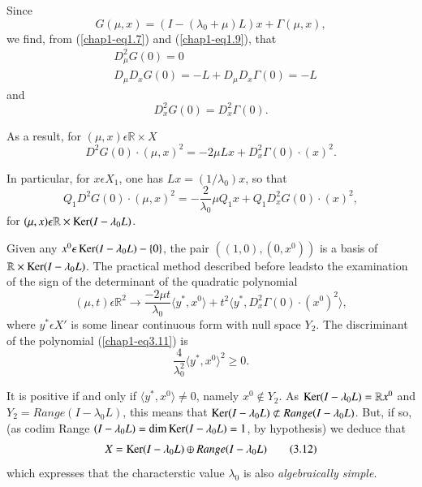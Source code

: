 Since
$$
G(\mu, x) = (I - (\lambda_{0} + \mu) L) x + \Gamma(\mu, x),
$$
we find, from (\ref{chap1-eq1.7}) and (\ref{chap1-eq1.9}), that
\begin{align*}
& D_{\mu}^{2}G(0) = 0\\
& D_{\mu}D_{x}G(0) = -L + D_{\mu} D_{x} \Gamma (0) = -L
\end{align*}
and
$$
D_{x}^{2}G(0) = D_{x}^{2}\Gamma(0).
$$

As a result, for $(\mu, x) \epsilon \mathbb{R} \times X$
$$
D^{2}G(0) \cdot (\mu, x)^{2} = -2\mu L x + D_{x}^{2} \Gamma(0) \cdot (x)^{2}.
$$

In particular, for $x \epsilon X_{1}$, one has $Lx = (1/ \lambda_{0})x$, so that
$$
Q_{1}D^{2}G(0) \cdot (\mu, x)^{2} = -\frac{2}{\lambda_{0}} \mu Q_{1} x + Q_{1}D_{x}^{2}G(0) \cdot (x)^{2},
$$
for $(\mu, x) \epsilon \mathbb{R} \times \operatorname{Ker} (I - \lambda_{0}L)$.

Given any $x^{0} \epsilon \operatorname{Ker} (I - \lambda_{0} L) - \{0\}$, the pair $((1, 0), (0, x^{0}))$ is a basis of $\mathbb{R} \times \operatorname{Ker} (I - \lambda_{0}L)$. The practical method described before leads\pageoriginale to the examination of the sign of the determinant of the quadratic polynomial
\begin{equation*}
(\mu, t) \epsilon \mathbb{R}^{2} \to \frac{-2\mu t}{\lambda_{0}} \langle y^{*}, x^{0} \rangle + t^{2} \langle y^{*}, D_{x}^{2} \Gamma(0) \cdot (x^{0})^{2} \rangle,\tag{3.11}\label{chap1-eq3.11}
\end{equation*}
where $y^{*} \epsilon X'$ is some linear continuous form with null space $Y_{2}$. The discriminant of the polynomial (\ref{chap1-eq3.11}) is
$$
\frac{4}{\lambda_{0}^{2}} \langle y^{*}, x^{0} \rangle^{2} \geq 0.
$$

It is positive if and only if $\langle y^{*}, x^{0}  \rangle \neq 0$, namely $x^{0} \notin Y_{2}$. As $\operatorname{Ker} (I - \lambda_{0}L) = \mathbb{R} x^{0}$ and $Y_{2} = Range (I - \lambda_{0}L)$, this means that $\Ker (I - \lambda_{0}L) \nsubset Range (I - \lambda_{0}L)$. But, if so, (as codim Range $(I - \lambda_{0}L) = \dim \operatorname{Ker} (I - \lambda_{0}L) = 1$, by hypothesis) we deduce that
\begin{equation*}
X = \operatorname{Ker} (I - \lambda_{0}L) \oplus Range (I - \lambda_{0}L)\tag{3.12}\label{chap1-eq3.12}
\end{equation*}
which expresses that the characterstic value $\lambda_{0}$ is also {\em algebraically simple}.

